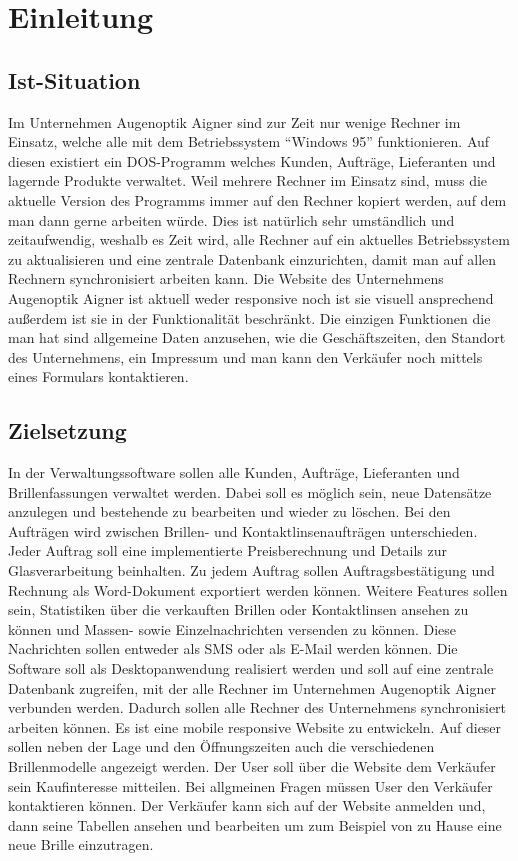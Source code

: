 \chapter{Einleitung}
\section{Ist-Situation}
Im Unternehmen Augenoptik Aigner sind zur Zeit nur wenige Rechner im Einsatz, welche alle mit dem Betriebssystem “Windows 95” funktionieren. Auf diesen existiert ein DOS-Programm welches Kunden,  Aufträge, Lieferanten und lagernde Produkte  verwaltet. Weil mehrere Rechner im Einsatz sind, muss die aktuelle Version des Programms immer auf den Rechner kopiert werden, auf dem man dann gerne arbeiten würde. Dies ist natürlich sehr umständlich und zeitaufwendig, weshalb es Zeit wird, alle Rechner auf ein aktuelles Betriebssystem zu aktualisieren und eine zentrale Datenbank einzurichten, damit man auf allen Rechnern synchronisiert arbeiten kann.\newline
Die Website des Unternehmens Augenoptik Aigner ist aktuell weder responsive noch ist sie visuell ansprechend außerdem ist sie in der Funktionalität beschränkt. Die einzigen Funktionen die man hat sind allgemeine Daten anzusehen, wie die Geschäftszeiten, den Standort des Unternehmens, ein Impressum und man kann den Verkäufer noch mittels eines Formulars kontaktieren. 

\section{Zielsetzung}
In der Verwaltungssoftware sollen alle Kunden, Aufträge, Lieferanten und Brillenfassungen verwaltet werden. Dabei soll es möglich sein, neue Datensätze anzulegen und bestehende zu bearbeiten und wieder zu löschen. Bei den Aufträgen wird zwischen Brillen- und Kontaktlinsenaufträgen unterschieden. Jeder Auftrag soll eine implementierte Preisberechnung und Details zur Glasverarbeitung beinhalten. Zu jedem Auftrag sollen Auftragsbestätigung und Rechnung als Word-Dokument exportiert werden können. \newline Weitere Features sollen sein, Statistiken über die verkauften Brillen oder Kontaktlinsen ansehen zu können und Massen- sowie Einzelnachrichten versenden zu können. Diese Nachrichten sollen entweder als SMS oder als E-Mail werden können. \newline Die Software soll als Desktopanwendung realisiert werden und soll auf eine zentrale Datenbank zugreifen, mit der alle Rechner im Unternehmen Augenoptik Aigner verbunden werden. Dadurch sollen alle Rechner des Unternehmens synchronisiert arbeiten können.
Es ist eine mobile responsive Website zu entwickeln. Auf dieser sollen neben der Lage und den Öffnungszeiten auch die verschiedenen Brillenmodelle angezeigt werden. Der User soll über die Website dem Verkäufer sein Kaufinteresse mitteilen. Bei allgmeinen Fragen müssen User den Verkäufer kontaktieren können. Der Verkäufer kann sich auf der Website anmelden und, dann seine Tabellen ansehen und bearbeiten um zum Beispiel von zu Hause eine neue Brille einzutragen. 

